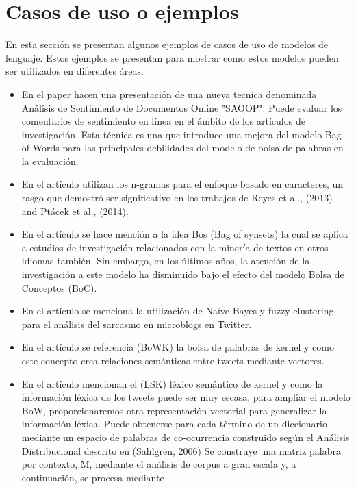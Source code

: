 \documentclass[12pt, conference]{IEEEtran}
\begin{document}
\section{Casos de uso o ejemplos}

En esta sección se presentan algunos ejemplos de casos de uso de modelos de lenguaje. Estos ejemplos se presentan para mostrar como estos modelos pueden ser utilizados en diferentes áreas.

\begin{itemize}
  
\item En el paper \cite{r1} hacen una presentación de una nueva tecnica denominada Análisis de Sentimiento de Documentos Online "SAOOP". 
Puede evaluar los comentarios de sentimiento en línea en el ámbito de los artículos de investigación.
Esta técnica es una que introduce una mejora del modelo Bag-of-Words para las
principales debilidades del modelo de bolsa de palabras en la evaluación.
\item En el artículo \cite{r2}  utilizan los n-gramas para el enfoque basado en caracteres, un rasgo que demostró ser significativo
en los trabajos de Reyes et al., (2013) and Ptácek et al., (2014).
\item En el artículo \cite{r3} se hace mención a la idea Bos (Bag of synsets) la cual se aplica
a estudios de investigación relacionados con la minería de textos en otros idiomas también. Sin embargo, en los
últimos años, la atención de la investigación a este modelo ha disminuido bajo el efecto del modelo Bolsa de
Conceptos (BoC).
\item En el artículo \cite{r4} se menciona la utilización de Naïve Bayes y fuzzy clustering para el
análisis del sarcasmo en microblogs en Twitter.
\item En el artículo \cite{r5} se referencia (BoWK) la bolsa de palabras de kernel y como este concepto 
crea relaciones semánticas entre tweets mediante vectores.
\item En el artículo \cite{r6} mencionan el (LSK) léxico semántico de kernel y como la información
 léxica de los tweets puede ser muy escasa, para ampliar el modelo BoW, proporcionaremos
 otra representación vectorial
 para generalizar la información léxica. Puede obtenerse para cada término de un diccionario mediante un
 espacio de palabras de co-ocurrencia construido según el Análisis Distribucional descrito en (Sahlgren, 2006)
 Se construye una matriz palabra por contexto, M, mediante el análisis de corpus a gran escala y, a continuación, se procesa mediante

\end{itemize}
\end{document}
